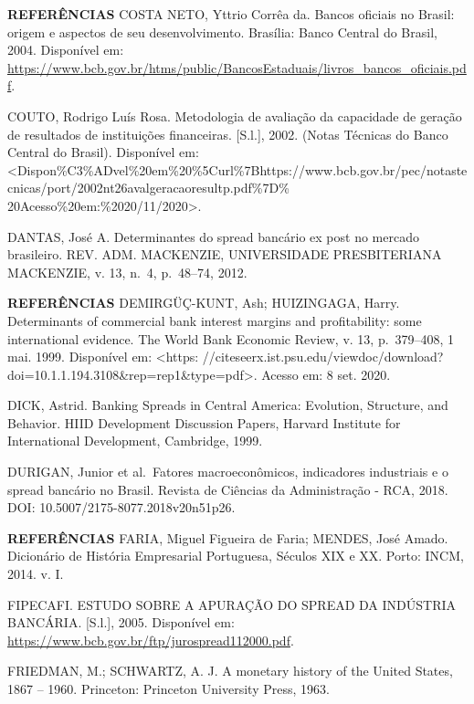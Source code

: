 \documentclass[
  ignorenonframetext,
  aspectratio=169,
  ignorenonframetext]{beamer}
\begin{document}
\begin{frame}{\textbf{REFERÊNCIAS}}
\protect\hypertarget{referuxeancias-11}{}
COSTA NETO, Yttrio Corrêa da. Bancos oficiais no Brasil: origem e
aspectos de seu desenvolvimento. Brasília: Banco Central do Brasil,
2004. Disponível em:
\url{https://www.bcb.gov.br/htms/public/BancosEstaduais/livros_bancos_oficiais.pdf}.

COUTO, Rodrigo Luís Rosa. Metodologia de avaliação da capacidade de
geração de resultados de instituições financeiras. {[}S.l.{]}, 2002.
(Notas Técnicas do Banco Central do Brasil). Disponível em:
\textless Dispon\%C3\%ADvel\%20em\%20\%5Curl\%7Bhttps://www.bcb.gov.br/pec/notastecnicas/port/2002nt26avalgeracaoresultp.pdf\%7D\%
20Acesso\%20em:\%2020/11/2020\textgreater.

DANTAS, José A. Determinantes do spread bancário ex post no mercado
brasileiro. REV. ADM. MACKENZIE, UNIVERSIDADE PRESBITERIANA MACKENZIE,
v. 13, n.~4, p.~48--74, 2012.
\end{frame}

\begin{frame}{\textbf{REFERÊNCIAS}}
\protect\hypertarget{referuxeancias-12}{}
DEMIRGÜÇ-KUNT, Ash; HUIZINGAGA, Harry. Determinants of commercial bank
interest margins and profitability: some international evidence. The
World Bank Economic Review, v. 13, p.~379--408, 1 mai. 1999. Disponível
em: \textless https:
//citeseerx.ist.psu.edu/viewdoc/download?doi=10.1.1.194.3108\&rep=rep1\&type=pdf\textgreater.
Acesso em: 8 set. 2020.

DICK, Astrid. Banking Spreads in Central America: Evolution, Structure,
and Behavior. HIID Development Discussion Papers, Harvard Institute for
International Development, Cambridge, 1999.

DURIGAN, Junior et al.~Fatores macroeconômicos, indicadores industriais
e o spread bancário no Brasil. Revista de Ciências da Administração -
RCA, 2018. DOI: 10.5007/2175-8077.2018v20n51p26.
\end{frame}

\begin{frame}{\textbf{REFERÊNCIAS}}
\protect\hypertarget{referuxeancias-13}{}
FARIA, Miguel Figueira de Faria; MENDES, José Amado. Dicionário de
História Empresarial Portuguesa, Séculos XIX e XX. Porto: INCM, 2014. v.
I.

FIPECAFI. ESTUDO SOBRE A APURAÇÃO DO SPREAD DA INDÚSTRIA BANCÁRIA.
{[}S.l.{]}, 2005. Disponível em:
\url{https://www.bcb.gov.br/ftp/jurospread112000.pdf}.

FRIEDMAN, M.; SCHWARTZ, A. J. A monetary history of the United States,
1867 -- 1960. Princeton: Princeton University Press, 1963.
\end{frame}
\end{document}
